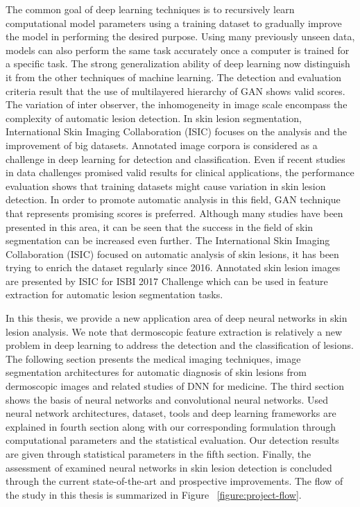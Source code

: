 The common goal of deep learning techniques is to recursively learn computational model parameters using a training dataset to gradually improve the model in performing the desired purpose.
Using many previously unseen data, models can also perform the same task accurately once a computer is trained for a specific task.
The strong generalization ability of deep learning now distinguish it from the other techniques of machine learning.
The detection and evaluation criteria result that the use of multilayered hierarchy of GAN shows valid scores.
The variation of inter observer, the inhomogeneity in image scale encompass the complexity of automatic lesion detection.
In skin lesion segmentation, International Skin Imaging Collaboration (ISIC) focuses on the analysis and the improvement of big datasets.
Annotated image corpora is considered as a challenge in deep learning for detection and classification.
Even if recent studies in data challenges promised valid results for clinical applications, the performance evaluation shows that training datasets might cause variation in skin lesion detection.
In order to promote automatic analysis in this field, GAN technique that represents promising scores is preferred.
Although many studies have been presented in this area, it can be seen that the success in the field of skin segmentation can be increased even further.
The International Skin Imaging Collaboration (ISIC) focused on automatic analysis of skin lesions, it has been trying to enrich the dataset regularly since 2016.
Annotated skin lesion images are presented by ISIC for ISBI 2017 Challenge which can be used in feature extraction for automatic lesion segmentation tasks.



In this thesis, we provide a new application area of deep neural networks in skin lesion analysis.
We note that dermoscopic feature extraction is relatively a new problem in deep learning to address the detection and the classification of lesions.
The following section presents the medical imaging techniques, image segmentation architectures for automatic diagnosis of skin lesions from dermoscopic images and related studies of DNN for medicine.
The third section shows the basis of neural networks and convolutional neural networks.
Used neural network architectures, dataset, tools and deep learning frameworks are explained in fourth section
along with our corresponding formulation through computational parameters and the statistical evaluation.
Our detection results are given through statistical parameters in the fifth section.
Finally, the assessment of examined neural networks in skin lesion detection is concluded through the current state-of-the-art and prospective improvements.
The flow of the study in this thesis is summarized in Figure ~\ref{figure:project-flow}.
